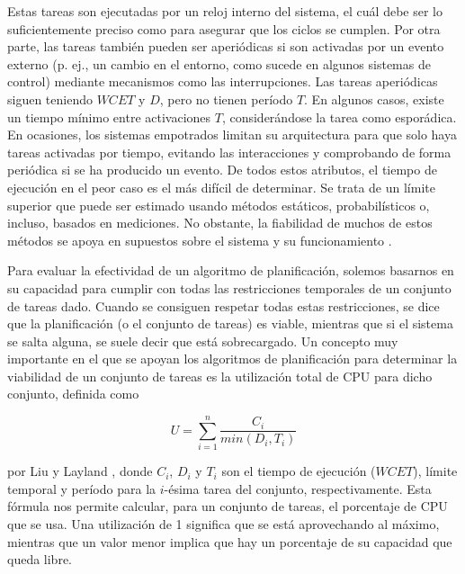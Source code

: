 Estas tareas son ejecutadas por un reloj interno del sistema, el cuál debe ser
lo suficientemente preciso como para asegurar que los ciclos se cumplen. Por
otra parte, las tareas también pueden ser aperiódicas si son activadas por un
evento externo (p. ej., un cambio en el entorno, como sucede en algunos sistemas
de control) mediante mecanismos como las interrupciones. Las tareas aperiódicas
siguen teniendo $WCET$ y $D$, pero no tienen período $T$. En algunos casos,
existe un tiempo mínimo entre activaciones $T$, considerándose la tarea como
esporádica. En ocasiones, los sistemas empotrados limitan su arquitectura para
que solo haya tareas activadas por tiempo, evitando las interacciones y
comprobando de forma periódica si se ha producido un evento. De todos estos
atributos, el tiempo de ejecución en el peor caso es el más difícil de
determinar. Se trata de un límite superior que puede ser estimado usando métodos
estáticos, probabilísticos o, incluso, basados en mediciones. No obstante, la
fiabilidad de muchos de estos métodos se apoya en supuestos sobre el sistema y
su funcionamiento \cite{abella_wcet_2015}.

Para evaluar la efectividad de un algoritmo de planificación, solemos basarnos
en su capacidad para cumplir con todas las restricciones temporales de un
conjunto de tareas dado. Cuando se consiguen respetar todas estas restricciones,
se dice que la planificación (o el conjunto de tareas) es viable, mientras que
si el sistema se salta alguna, se suele decir que está sobrecargado. Un concepto
muy importante en el que se apoyan los algoritmos de planificación para
determinar la viabilidad de un conjunto de tareas es la utilización total de CPU
para dicho conjunto, definida como

\begin{equation}
  U = \sum_{i=1}^{n} \frac{C_{i}}{min(D_{i}, T_{i})}
\end{equation}

por Liu y Layland \cite{liu_scheduling_1973}, donde $C_{i}$, $D_{i}$ y $T_{i}$
son el tiempo de ejecución ($WCET$), límite temporal y período para la $i$-ésima
tarea del conjunto, respectivamente. Esta fórmula nos permite calcular, para un
conjunto de tareas, el porcentaje de CPU que se usa. Una utilización de 1
significa que se está aprovechando al máximo, mientras que un valor menor
implica que hay un porcentaje de su capacidad que queda libre.


